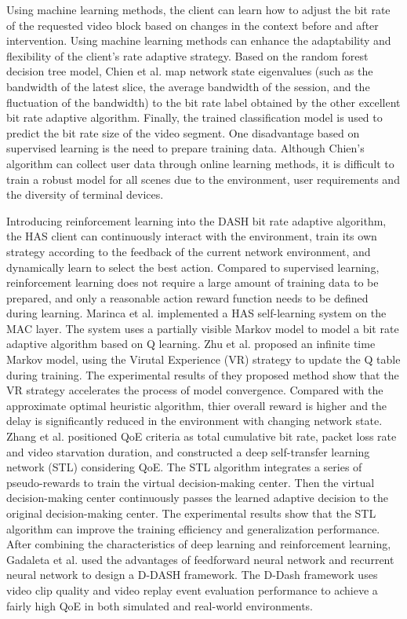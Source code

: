 \documentclass[twocolumn]{article}
\begin{document}
 Using machine learning methods, the client can learn how to adjust the bit 
 rate of the requested video block based on changes in the context before and after intervention.
 Using machine learning methods can enhance the adaptability and flexibility of the client's rate adaptive strategy.
 Based on the random forest decision tree model, Chien et al\cite{RN9}. map network state eigenvalues 
 (such as the bandwidth of the latest slice, the average bandwidth of the session, and the fluctuation of the bandwidth) 
 to the bit rate label obtained by the other excellent bit rate adaptive algorithm. 
 Finally, the trained classification model is used to predict the bit rate size of the video segment.
 One disadvantage based on supervised learning is the need to prepare training data. 
 Although Chien's algorithm can collect user data through online learning methods, 
 it is difficult to train a robust model for all scenes due to the environment, 
 user requirements and the diversity of terminal devices.

 Introducing reinforcement learning into the DASH bit rate adaptive algorithm, 
 the HAS client can continuously interact with the environment, 
 train its own strategy according to the feedback of the current network 
 environment, and dynamically learn to select the best action.
 Compared to supervised learning, reinforcement learning does not require a 
 large amount of training data to be prepared, and only a reasonable 
 action reward function needs to be defined during learning.
 Marinca et al\cite{RN10}. implemented a HAS self-learning system on the MAC layer. 
 The system uses a partially visible Markov model to model a bit rate adaptive algorithm based on Q learning.
 Zhu et al\cite{RN11}. proposed an infinite time Markov model, 
 using the Virutal Experience (VR) strategy to update the Q table during training.
 The experimental results of they proposed method show that the VR strategy accelerates 
 the process of model convergence. Compared with the approximate optimal heuristic algorithm,
  thier overall reward is higher and the delay is significantly reduced in the environment with changing network state.
Zhang et al\cite{RN12}. positioned QoE criteria as total cumulative bit rate, 
packet loss rate and video starvation duration, and constructed a 
deep self-transfer learning network (STL) considering QoE.
The STL algorithm integrates a series of pseudo-rewards to train the virtual decision-making center.
Then the virtual decision-making center continuously passes the learned adaptive 
decision to the original decision-making center. The experimental results show that the STL 
algorithm can improve the training efficiency and generalization performance.
After combining the characteristics of deep learning and reinforcement learning, 
Gadaleta et al\cite{RN14}. used the advantages of feedforward neural network and recurrent neural network to design a D-DASH framework.
The D-Dash framework uses video clip quality and video replay event 
evaluation performance to achieve a fairly high QoE in both simulated and real-world environments.
\end{document}
